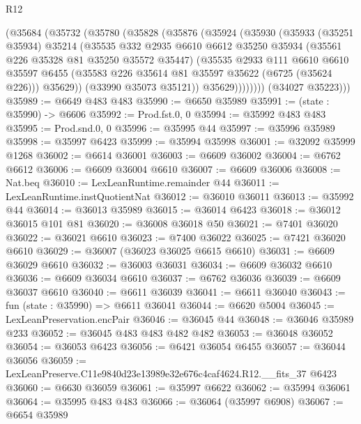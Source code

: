 \begin{lexlean}{R12}
\begin{coremodule}
          (@35684
            (@35732
              (@35780
                (@35828
                  (@35876
                    (@35924
                      (@35930
                        (@35933
                          (@35251 @35934)
                          @35214
                          (@35535
                            @332
                            @2935
                            @6610
                            @6612
                            @35250
                            @35934
                            (@35561 @226 @35328 @81 @35250 @35572 @35447)
                            (@35535
                              @2933
                              @111
                              @6610
                              @6610
                              @35597
                              @6455
                              (@35583 @226 @35614 @81 @35597 @35622 (@6725 (@35624 @226)))
                              @35629))
                          (@33990 @35073 @35121))
                        @35629))))))))
        (@34027 @35223)))
@35989 := @6649 @483 @483
@35990 := @6650 @35989
@35991 := (state : @35990) -> @6606
@35992 := Prod.fst.{0, 0}
@35994 := @35992 @483 @483
@35995 := Prod.snd.{0, 0}
@35996 := @35995 @44
@35997 := @35996 @35989
@35998 := @35997 @6423
@35999 := @35994 @35998
@36001 := @32092 @35999 @1268
@36002 := @6614 @36001
@36003 := @6609 @36002
@36004 := @6762 @6612
@36006 := @6609 @36004 @6610
@36007 := @6609 @36006
@36008 := Nat.beq
@36010 := LexLeanRuntime.remainder @44
@36011 := LexLeanRuntime.instQuotientNat
@36012 := @36010 @36011
@36013 := @35992 @44
@36014 := @36013 @35989
@36015 := @36014 @6423
@36018 := @36012 @36015 @101 @81
@36020 := @36008 @36018 @50
@36021 := @7401 @36020
@36022 := @36021 @6610
@36023 := @7400 @36022
@36025 := @7421 @36020 @6610
@36029 := @36007 (@36023 @36025 @6615 @6610)
@36031 := @6609 @36029 @6610
@36032 := @36003 @36031
@36034 := @6609 @36032 @6610
@36036 := @6609 @36034 @6610
@36037 := @6762 @36036
@36039 := @6609 @36037 @6610
@36040 := @6611 @36039
@36041 := @6611 @36040
@36043 := fun (state : @35990) => @6611 @36041
@36044 := @6620 @5004
@36045 := LexLeanPreservation.encPair
@36046 := @36045 @44
@36048 := @36046 @35989 @233
@36052 := @36045 @483 @483 @482 @482
@36053 := @36048 @36052
@36054 := @36053 @6423
@36056 := @6421 @36054 @6455
@36057 := @36044 @36056
@36059 := LexLeanPreserve.C11e9840d23e13989e32e676c4caf4624.R12.__fits_37 @6423
@36060 := @6630 @36059
@36061 := @35997 @6622
@36062 := @35994 @36061
@36064 := @35995 @483 @483
@36066 := @36064 (@35997 @6908)
@36067 := @6654 @35989

\end{coremodule}
\end{lexlean}
